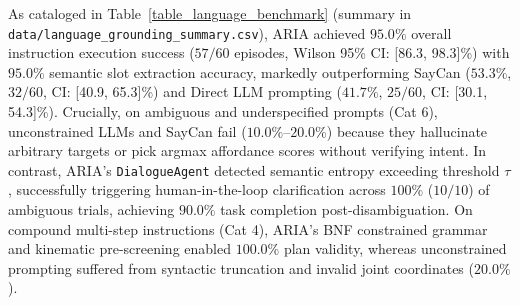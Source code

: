\documentclass[journal]{IEEEtran}
\begin{document}
\begin{table}[!t]
\centering
\caption{Empirical Language Grounding and Instruction Benchmark ($N=60$ Episodes Across Six Instruction Categories)}
\label{table_language_benchmark}
\footnotesize
{}
\end{table}

As cataloged in Table~\ref{table_language_benchmark} (summary in \texttt{data/language\_grounding\_summary.csv}), ARIA achieved $95.0\%$ overall instruction execution success ($57/60$ episodes, Wilson 95\% CI: [86.3, 98.3]\%) with $95.0\%$ semantic slot extraction accuracy, markedly outperforming SayCan ($53.3\%$, $32/60$, CI: [40.9, 65.3]\%) and Direct LLM prompting ($41.7\%$, $25/60$, CI: [30.1, 54.3]\%). Crucially, on ambiguous and underspecified prompts (Cat 6), unconstrained LLMs and SayCan fail ($10.0\%\text{--}20.0\%$) because they hallucinate arbitrary targets or pick argmax affordance scores without verifying intent. In contrast, ARIA's \texttt{DialogueAgent} detected semantic entropy exceeding threshold $\tau$, successfully triggering human-in-the-loop clarification across $100\%$ ($10/10$) of ambiguous trials, achieving $90.0\%$ task completion post-disambiguation. On compound multi-step instructions (Cat 4), ARIA's BNF constrained grammar and kinematic pre-screening enabled $100.0\%$ plan validity, whereas unconstrained prompting suffered from syntactic truncation and invalid joint coordinates ($20.0\%$).
\end{document}
